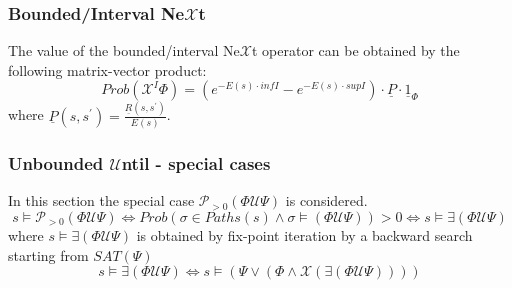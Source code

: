 \documentclass[a4paper,10pt]{article}
\begin{document}
	\subsubsection{Bounded/Interval Ne$\mathcal{X}$t}
	The value of the bounded/interval Ne$\mathcal{X}$t operator can be obtained by the following matrix-vector product:
	\begin{equation*}
	Prob(\mathcal{X}^I\Phi) = (e^{-E(s) \cdot inf I}-e^{-E(s) \cdot sup I}) \cdot \underline{P} \cdot \underline{1}_{\Phi}
	\end{equation*}
	where $\underline{P}(s,s^{\prime})=\frac{\underline{R}(s,s^{\prime})}{E(s)}$.
	\subsubsection{Unbounded $\mathcal{U}$ntil - special cases}
	In this section the special case $\mathcal{P}_{>0}(\Phi \mathcal{U} \Psi)$ is considered.
	\begin{equation*}
		s\vDash\mathcal{P}_{>0}(\Phi \mathcal{U} \Psi) \Leftrightarrow Prob(\sigma \in Paths(s) \wedge \sigma \vDash (\Phi \mathcal{U} \Psi))>0 \Leftrightarrow s\vDash\exists(\Phi \mathcal{U} \Psi)
	\end{equation*}
	where $s\vDash\exists(\Phi \mathcal{U} \Psi)$ is obtained by fix-point iteration by a backward search starting from $SAT(\Psi)$
	\begin{equation*}
	s\vDash\exists(\Phi \mathcal{U} \Psi) \Leftrightarrow s\vDash (\Psi \vee (\Phi \wedge \mathcal{X}(\exists(\Phi \mathcal{U} \Psi))))
	\end{equation*}
\end{document}
